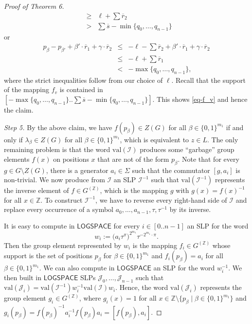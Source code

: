 \documentclass[10pt,a4paper]{article}
\newcommand{\ccinterval}[2]{[{#1}..{#2}]}
\newcommand{\Z}{\ensuremath{\mathbb Z}}
\newcommand{\cointerval}[2]{[{#1}..{#2}-1]}
\newcommand{\val}{\mathrm{val}}
\renewcommand{\L}{\ensuremath{\mathsf{LOGSPACE}}\xspace}
\begin{document}
\begin{proof}[Proof of Theorem 6]
\begin{eqnarray*}
& \geq & \ell + \sum \overline{r}_2 \\
& > & \sum \overline{s} -  \min\{ q_0, \ldots, q_{n-1}\}
\end{eqnarray*}
or
\begin{eqnarray*}
p_{\beta} - p_{\beta'} +\beta' \cdot \overline{r}_1 + \gamma \cdot \overline{r}_2 & \leq & -\ell - \sum \overline{r}_2 + \beta' \cdot \overline{r}_1 + \gamma \cdot \overline{r}_2 \\
& \leq & -\ell + \sum \overline{r}_1  \\
& < &  - \max\{ q_0, \ldots, q_{n-1}\},
\end{eqnarray*}
where the strict inequalities follow from our choice of $\ell$.
Recall that the support of the mapping $f_v$ is contained  in $\ccinterval{-\max\{ q_0, \ldots, q_{n-1}\}}{\sum \overline{s}-\min\{ q_0, \ldots, q_{n-1}\}}$.
This shows \eqref{eq-f_v} and hence the claim.



\medskip
\noindent
{\em Step 5.} By the above claim, we have $f(p_{\beta}) \in Z(G)$ for all $\beta \in \{0,1\}^{m_1}$ if and only if 
$\lambda_{\beta} \in Z(G)$ for all $\beta \in \{0,1\}^{m_1}$, which is equivalent to $z \in L$. 
The only remaining problem is that the word $\val(\mathcal{I})$ produces some ``garbage'' group elements $f(x)$ on 
positions $x$ that are not of the form $p_\beta$. Note that for every $g \in G \setminus Z(G)$, there is a generator $a_i \in \Sigma$ such that the commutator 
$[g,a_i]$ is non-trivial. We now produce from $\mathcal{I}$ an SLP $\mathcal{I}^{-1}$ such that $\val(\mathcal{I}^{-1})$ represents
the inverse element of $f \in G^{(\Z)}$, which is the mapping $g$ with $g(x) = f(x)^{-1}$ for all $x \in \mathbb{Z}$. To construct $\mathcal{I}^{-1}$,
we have to reverse every right-hand side of $\mathcal{I}$ and replace every occurrence of a symbol $a_0, \ldots, a_{n-1}, \tau, \tau^{-1}$ by
its inverse. 

It is easy to compute in \L for every $i \in \cointerval{0}{n}$ an SLP for the word 
\[ 
w_i := \big(a_i \tau^\pi \big)^{2^{m_1}} \tau^{-2^{m_1} \cdot \pi} .
\]
Then the group element represented by $w_i$ is the mapping $f_i \in G^{(\Z)}$  whose  support 
is the set of positions $p_\beta$ for $\beta \in \{0,1\}^{m_1}$ and 
$f_i(p_\beta) = a_i$ for all $\beta \in \{0,1\}^{m_1}$.
We can also compute in \L an SLP for the word $w_i^{-1}$.
We then built in \L SLPs $\mathcal{J}_0, \ldots, \mathcal{J}_{n-1}$ such that $\val(\mathcal{J}_i) = \val(\mathcal{I}^{-1}) w_i^{-1} \val(\mathcal{I}) w_i$.
Hence, the word $\val(\mathcal{J}_i)$ represents the group element $g_i \in G^{(\Z)}$, where $g_i(x) = 1$ for all 
$x \in \mathbb{Z}\setminus \{ p_\beta \mid \beta \in \{0,1\}^{m_1} \}$ and 
$g_i(p_\beta) = f(p_\beta)^{-1} a_i^{-1} f(p_\beta) a_i  = [f(p_\beta),a_i]$. 


\end{proof}
\end{document}

